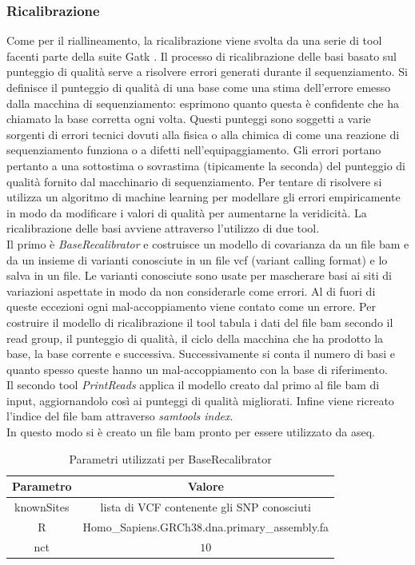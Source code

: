     \subsubsection{Ricalibrazione}
    Come per il riallineamento, la ricalibrazione viene svolta da una serie di tool facenti parte della suite Gatk \cite{gatk}.
    Il processo di ricalibrazione delle basi basato sul punteggio di qualit\`a serve a risolvere errori generati durante il sequenziamento.
    Si definisce il punteggio di qualit\`a di una base come una stima dell'errore emesso dalla macchina di sequenziamento: esprimono quanto questa \`e confidente che ha chiamato la base corretta ogni volta.
    Questi punteggi sono soggetti a varie sorgenti di errori tecnici dovuti alla fisica o alla chimica di come una reazione di sequenziamento funziona o a difetti nell'equipaggiamento.
    Gli errori portano pertanto a una sottostima o sovrastima (tipicamente la seconda) del punteggio di qualit\`a fornito dal macchinario di sequenziamento.
    Per tentare di risolvere si utilizza un algoritmo di machine learning per modellare gli errori empiricamente in modo da modificare i valori di qualit\`a per aumentarne la veridicit\`a.
    La ricalibrazione delle basi avviene attraverso l'utilizzo di due tool.\\
    Il primo \`e \emph{BaseRecalibrator} \cite{baserecalibrator} e costruisce un modello di covarianza da un file bam e da un insieme di varianti conosciute in un file vcf (variant calling format) e lo salva in un file.
    Le varianti conosciute sono usate per mascherare basi ai siti di variazioni aspettate in modo da non considerarle come errori.
    Al di fuori di queste eccezioni ogni mal-accoppiamento viene contato come un errore.
    Per costruire il modello di ricalibrazione il tool tabula i dati del file bam secondo il read group, il punteggio di qualit\`a, il ciclo della macchina che ha prodotto la base, la base corrente e successiva.
    Successivamente si conta il numero di basi e quanto spesso queste hanno un mal-accoppiamento con la base di riferimento.\\
    Il secondo tool \emph{PrintReads} \cite{printreads} applica il modello creato dal primo al file bam di input, aggiornandolo cos\`i ai punteggi di qualit\`a migliorati.
    Infine viene ricreato l'indice del file bam attraverso \emph{samtools index}.\\
    In questo modo si \`e creato un file bam pronto per essere utilizzato da aseq.
    \begin{table}[H]
        \centering
        \begin{tabular}{|c|c|}
                \hline
                Parametro & Valore\\
                \hline
                knownSites & lista di VCF contenente gli SNP conosciuti\\
                \hline
                R & Homo\_Sapiens.GRCh38.dna.primary\_assembly.fa\\
                \hline
                nct & $10$\\
                \hline
         \end{tabular}
         \caption{Parametri utilizzati per BaseRecalibrator}
    \end{table}

